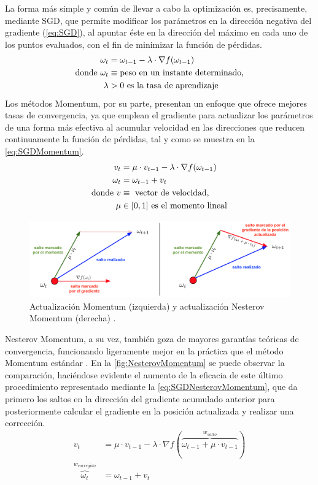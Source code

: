 La forma más simple y común de llevar a cabo la optimización es, precisamente, mediante SGD, que permite modificar los parámetros en la dirección negativa del gradiente (\autoref{eq:SGD}), al apuntar éste en la dirección del máximo en cada uno de los puntos evaluados, con el fin de minimizar la función de pérdidas.
\begin{align} \label{eq:SGD}
    \omega_t &= \omega_{t-1} - \lambda \cdot \nabla f(\omega_{t-1}) \\
    \text{donde}~  
    \omega_t &\equiv \text{peso en un instante determinado,} \notag \\
    \lambda &> 0 \text{\space es la tasa de aprendizaje} \notag
\end{align}
Los métodos Momentum, por su parte, presentan un enfoque que ofrece mejores tasas de convergencia, ya que emplean el gradiente para actualizar los parámetros de una forma más efectiva al acumular velocidad en las direcciones que reducen continuamente la función de pérdidas, tal y como se muestra en la \autoref{eq:SGDMomentum}. 
\begin{align}
    v_t &= \mu \cdot v_{t-1} - \lambda \cdot \nabla f(\omega_{t-1}) \\
    \omega_t &= \omega_{t-1} + v_t \label{eq:SGDMomentum} \\ 
    \text{donde}~
    v &\equiv \text{ vector de velocidad,} \notag \\
    \mu &\in [0,1] \text{\space es el momento lineal} \notag
\end{align}
\begin{figure}
    \centering
    \includegraphics[width=\textwidth]{Images/NesterovMomentum.png}
    \caption{Actualización Momentum (izquierda) y actualización Nesterov Momentum (derecha) \cite{CS231n}.}
    \label{fig:NesterovMomentum}
\end{figure}

Nesterov Momentum, a su vez, también goza de mayores garantías teóricas de convergencia, funcionando ligeramente mejor en la práctica que el método Momentum estándar \cite{Sutskever}. En la \autoref{fig:NesterovMomentum} se puede observar la comparación, haciéndose evidente el aumento de la eficacia de este último procedimiento representado mediante la \autoref{eq:SGDNesterovMomentum}, que da primero los saltos en la dirección del gradiente acumulado anterior para posteriormente calcular el gradiente en la posición actualizada y realizar una corrección.
\begin{align} 
    v_t &= \mu \cdot v_{t-1} - \lambda \cdot \nabla f(\overbrace{\omega_{t-1} + \mu \cdot v_{t-1}}^{w_{salto}}) \label{eq:SGDNM_1} \\
    \overbrace{\omega_t}^{w_{corregido}} &= \omega_{t-1} + v_t \label{eq:SGDNesterovMomentum}
\end{align}

